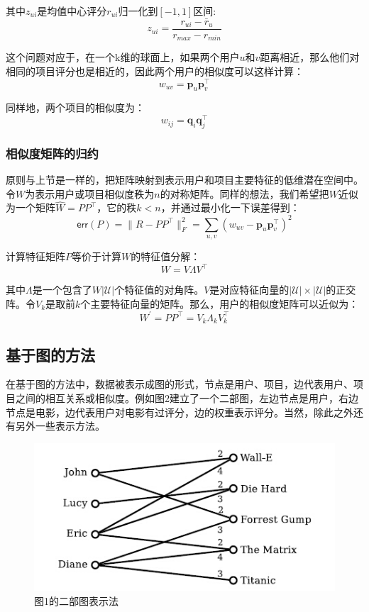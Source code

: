 \documentclass{article}
\begin{document}
 其中$z_{ui}$是均值中心评分$r_{ui}$归一化到$[-1,1]$区间:
 $$ z_{ui}=\frac{r_{ui}-\bar{r}_u}{r_{max}-r_{min}} $$

 这个问题对应于，在一个k维的球面上，如果两个用户$u$和$v$距离相近，那么他们对相同的项目评分也是相近的，因此两个用户的相似度可以这样计算：
 $$ w_{uv}=\mathbf{p}_u\mathbf{p}_v^{\top} $$

 同样地，两个项目的相似度为：
 $$ w_{ij}=\mathbf{q}_i\mathbf{q}_j^{\top} $$

 \subsubsection{相似度矩阵的归约}
 原则与上节是一样的，把矩阵映射到表示用户和项目主要特征的低维潜在空间中。令$W$为表示用户或项目相似度秩为$n$的对称矩阵。同样的想法，我们希望把$W$近似为一个矩阵$\hat{W}=PP^{\top}$，它的秩$k<n$，并通过最小化一下误差得到：
 $$ \mathsf{err}(P)=\|R-PP^{\top}\|^2_F=\mathop{\sum}\limits_{u,v}(w_{uv}-\mathbf{p}_u\mathbf{p}_v^{\top})^2 $$

 计算特征矩阵$P$等价于计算$W$的特征值分解：
 $$ W=V\Lambda V^{\top} $$

 其中$\Lambda$是一个包含了$W |\mathcal{U}|$个特征值的对角阵。$V$是对应特征向量的$|\mathcal{U}|\times|\mathcal{U}|$的正交阵。令$V_k$是取前$k$个主要特征向量的矩阵。那么，用户的相似度矩阵可以近似为：
 $$ W^{'}=PP^{\top}=V_k\Lambda_kV_k^{\top} $$

 \subsection{基于图的方法}
 在基于图的方法中，数据被表示成图的形式，节点是用户、项目，边代表用户、项目之间的相互关系或相似度。例如图2建立了一个二部图，左边节点是用户，右边节点是电影，边代表用户对电影有过评分，边的权重表示评分。当然，除此之外还有另外一些表示方法。
 \begin{figure}[!htb]
	  \begin{center}
	  	\includegraphics[scale=0.6]{f2.jpg}
	  	\caption{图1的二部图表示法}
	  \end{center}
 \end{figure}
\end{document}
